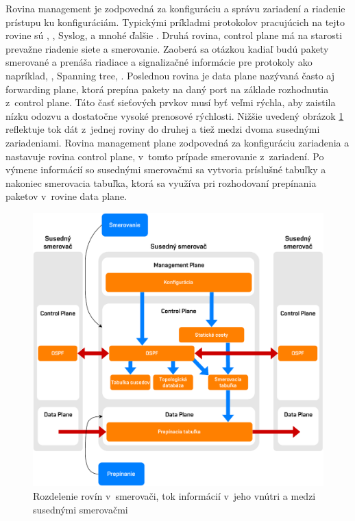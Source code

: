 Rovina management je zodpovedná za konfiguráciu a správu zariadení a riadenie prístupu ku konfiguráciám. Typickými príkladmi protokolov pracujúcich na tejto rovine sú , , Syslog,  a mnohé ďalšie \cite{Singh2018}. Druhá rovina, control plane má na starosti prevažne riadenie siete a smerovanie. Zaoberá sa otázkou kadiaľ budú pakety smerované a prenáša riadiace a signalizačné informácie pre protokoly ako napríklad, , Spanning tree,  \cite{Singh2018}. Poslednou rovina je data plane nazývaná často aj forwarding plane, ktorá prepína pakety na daný port na základe rozhodnutia z~control plane. Táto časť sieťových prvkov musí byť veľmi rýchla, aby zaistila nízku odozvu a dostatočne vysoké prenosové rýchlosti. Nižšie uvedený obrázok \ref{fig:sdn-planes} reflektuje tok dát z~jednej roviny do druhej a tiež medzi dvoma susednými zariadeniami. Rovina management plane zodpovedná za konfiguráciu zariadenia a nastavuje rovina control plane, v~tomto prípade smerovanie z~zariadení. Po výmene informácií so susednými smerovačmi sa vytvoria príslušné tabuľky a nakoniec smerovacia tabuľka, ktorá sa využíva pri rozhodovaní prepínania paketov v~rovine data plane.

\begin{figure}[H]
	\begin{center}
		\includegraphics[scale=0.6]{obrazky/SDN_planes.pdf}
	\end{center}
	\caption[Rozdelenie rovín v~smerovači, tok informácií v~jeho vnútri a medzi susednými smerovačmi]{Rozdelenie rovín v~smerovači, tok informácií v~jeho vnútri a medzi susednými smerovačmi \cite{Pepelnjak2013}}
	\label{fig:sdn-planes}
\end{figure} 



